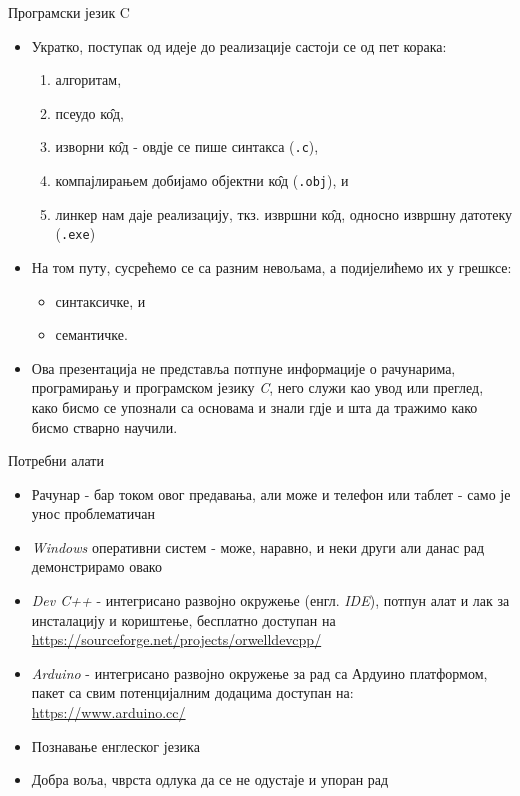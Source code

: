\documentclass{beamer}
\begin{document}
\begin{frame}{Програмски језик C}
\begin{itemize}
    \item Укратко, поступак од идеје до реализације састоји се од пет корака:
    \begin{enumerate}
        \item алгоритам,
        \item псеудо к\^{о}д,
        \item изворни к\^{о}д - овдје се пише синтакса (\texttt{.c}),
        \item компајлирањем добијамо објектни к\^{о}д (\texttt{.obj}), и
        \item линкер нам даје реализацију, ткз. извршни к\^{о}д, односно извршну датотеку (\texttt{.exe})
    \end{enumerate}
    \item На том путу, сусрећемо се са разним невољама, а подијелићемо их у грешксе:
    \begin{itemize}
        \item синтаксичке, и
        \item семантичке.
    \end{itemize}
    \item Ова презентација не представља потпуне информације о рачунарима, програмирању и програмском језику \textit{C}, него служи као увод или преглед, како бисмо се упознали са основама и знали гдје и шта да тражимо како бисмо стварно научили.
\end{itemize}
\end{frame}

\begin{frame}{Потребни алати}
\begin{itemize}
    \item Рачунар - бар током овог предавања, али може и телефон или таблет - само је унос проблематичан
    \item \textit{Windows} оперативни систем - може, наравно, и неки други али данас рад демонстрирамо овако
    \item \textit{Dev C++} - интегрисано развојно окружење (енгл. \textit{IDE}), потпун алат и лак за инсталацију и кориштење, бесплатно доступан на \color{orange}\href{https://sourceforge.net/projects/orwelldevcpp/}{https://sourceforge.net/projects/orwelldevcpp/}
    \item \color{black}\textit{Arduino} - интегрисано развојно окружење за рад са Ардуино платформом, пакет са свим потенцијалним додацима доступан на: \color{orange}\href{https://www.arduino.cc/}{https://www.arduino.cc/}\color{black}
    \item Познавање енглеског језика
    \item Добра воља, чврста одлука да се не одустаје и упоран рад
\end{itemize}
\end{frame}
\end{document}
